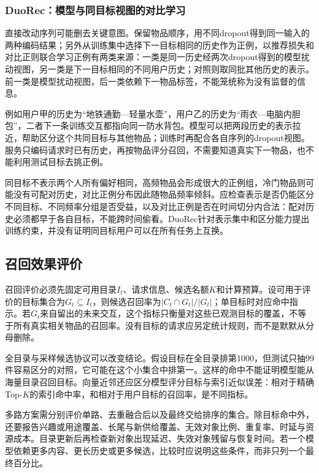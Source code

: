\subsubsection{DuoRec：模型与同目标视图的对比学习}
\label{sec:rs-duorec}

直接改动序列可能删去关键意图。保留物品顺序，用不同dropout得到同一输入的两种编码结果；另外从训练集中选择下一目标相同的历史作为正例，以推荐损失和对比正则联合学习正例有两类来源：一类是同一历史经两次dropout得到的模型扰动视图，另一类是下一目标相同的不同用户历史；对照则取同批其他历史的表示。前一类是模型扰动视图，后一类依赖下一物品标签，不能笼统称为没有监督的信息。

例如用户甲的历史为“地铁通勤—轻量水壶”，用户乙的历史为“雨衣—电脑内胆包”，二者下一条训练交互都指向同一防水背包。模型可以把两段历史的表示拉近，帮助区分这个共同目标与其他物品；训练时再配合各自序列的dropout视图。服务只编码请求时已有历史，再按物品评分召回，不需要知道真实下一物品，也不能利用测试目标去挑正例。

同目标不表示两个人所有偏好相同，高频物品会形成很大的正例组，冷门物品则可能没有可配对历史，对比正例分布因此随物品频率倾斜。应检查表示是否仍能区分不同目标、不同频率分组是否受益，以及对比正例是否在时间切分内合法：配对历史必须都早于各自目标，不能跨时间偷看。DuoRec针对表示集中和区分能力提出训练约束，并没有证明同目标用户可以在所有任务上互换。

\subsection{召回效果评价}
\label{sec:rs-retrieval-evaluation}

召回评价必须先固定可用目录$I_t$、请求信息、候选名额$K$和计算预算。设可用于评价的目标集合为$G_t\subseteq I_t$，则候选召回率为$|C_t\cap G_t|/|G_t|$；单目标时对应命中指示。若$G_t$来自留出的未来交互，这个指标只衡量对这些已观测目标的覆盖，不等于所有真实相关物品的召回率。没有目标的请求应另定统计规则，而不是默默从分母删除。

全目录与采样候选协议可以改变结论。假设目标在全目录排第1000，但测试只抽99件容易区分的对照，它可能在这个小集合中排第一。这样的命中不能证明模型能从海量目录召回目标。向量近邻还应区分模型评分目标与索引近似误差：相对于精确Top-$K$的索引命中率，和相对于用户目标的召回率，是不同指标。

多路方案需分别评价单路、去重融合后以及最终交给排序的集合。除目标命中外，还要报告兴趣或用途覆盖、长尾与新供给覆盖、无效对象比例、重复率、时延与资源成本。目录更新后再检查新对象出现延迟、失效对象残留与恢复时间。若一个模型依赖更多内容、更长历史或更多候选，比较时应说明这些条件，而非只列一个最终百分比。

